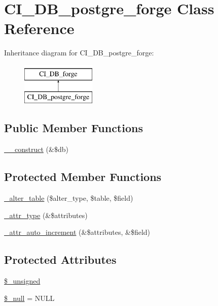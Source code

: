 \hypertarget{class_c_i___d_b__postgre__forge}{}\section{C\+I\+\_\+\+D\+B\+\_\+postgre\+\_\+forge Class Reference}
\label{class_c_i___d_b__postgre__forge}
Inheritance diagram for C\+I\+\_\+\+D\+B\+\_\+postgre\+\_\+forge\+:\begin{figure}[H]
\begin{center}
\leavevmode
\includegraphics[height=2.000000cm]{class_c_i___d_b__postgre__forge}
\end{center}
\end{figure}
\subsection*{Public Member Functions}
\begin{DoxyCompactItemize}
\item 
\hyperlink{class_c_i___d_b__postgre__forge_aaf2ef772755ec6f361d44e16cc9ffd69}{\+\_\+\+\_\+construct} (\&\$db)
\end{DoxyCompactItemize}
\subsection*{Protected Member Functions}
\begin{DoxyCompactItemize}
\item 
\hyperlink{class_c_i___d_b__postgre__forge_a41c6cae02f2fda8b429ad0afb9509426}{\+\_\+alter\+\_\+table} (\$alter\+\_\+type, \$table, \$field)
\item 
\hyperlink{class_c_i___d_b__postgre__forge_a8553be952084c6f7cdfff370a1d14f6b}{\+\_\+attr\+\_\+type} (\&\$attributes)
\item 
\hyperlink{class_c_i___d_b__postgre__forge_a2a013a5932439c3c44f0dad3436525f7}{\+\_\+attr\+\_\+auto\+\_\+increment} (\&\$attributes, \&\$field)
\end{DoxyCompactItemize}
\subsection*{Protected Attributes}
\begin{DoxyCompactItemize}
\item 
\hyperlink{class_c_i___d_b__postgre__forge_aae977ae6d61fa183f0b25422b6ddc31c}{\$\+\_\+unsigned}
\item 
\hyperlink{class_c_i___d_b__postgre__forge_ae58fe6a5104d4a069a49b27533ce808f}{\$\+\_\+null} = \textquotesingle{}N\+U\+L\+L\textquotesingle{}
\end{DoxyCompactItemize}
